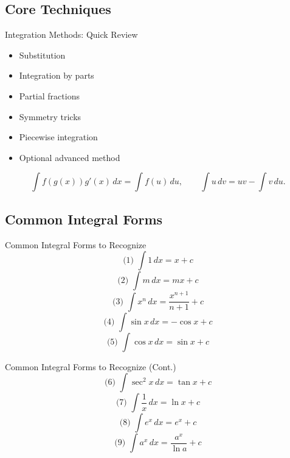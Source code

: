 \documentclass[aspectratio=169]{beamer}
\begin{document}
\subsection{Core Techniques}
\begin{frame}{Integration Methods: Quick Review}
  \begin{itemize}
    \item Substitution
    \item Integration by parts
    \item Partial fractions
    \item Symmetry tricks
    \item Piecewise integration
    \item Optional advanced method
  \end{itemize}
  \vspace{4pt}
  \[
    \int f(g(x))g'(x)\,dx=\int f(u)\,du,\qquad
    \int u\,dv=uv-\int v\,du.
  \]
\end{frame}

\subsection{Common Integral Forms}
\begin{frame}{Common Integral Forms to Recognize}
  \[
  \text{(1) }\int 1\,dx = x + c
  \]
  \[
  \text{(2) }\int m\,dx = mx + c
  \]
  \[
  \text{(3) }\int x^n\,dx = \frac{x^{n+1}}{n+1} + c
  \]
  \[
  \text{(4) }\int \sin x\,dx = -\cos x + c
  \]
  \[
  \text{(5) }\int \cos x\,dx = \sin x + c
  \]
\end{frame}

\begin{frame}{Common Integral Forms to Recognize (Cont.)}
  \[
  \text{(6) }\int \sec^2 x\,dx = \tan x + c
  \]
  \[
  \text{(7) }\int \frac{1}{x}\,dx = \ln x + c
  \]
  \[
  \text{(8) }\int e^x\,dx = e^x + c
  \]
  \[
  \text{(9) }\int a^x\,dx = \frac{a^x}{\ln a} + c
  \]
\end{frame}
\end{document}
